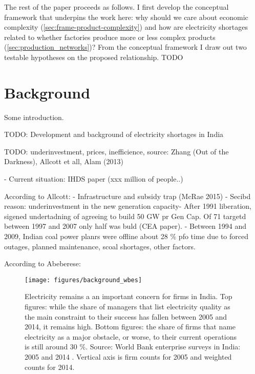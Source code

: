 \documentclass[11pt]{article}
\begin{document}
The rest of the paper proceeds as follows. I first develop the conceptual framework that underpins the work here: why should we care about economic complexity (\ref{sec:frame-product-complexity}) and how are electricity shortages related to whether factories produce more or less complex products (\ref{sec:production_networks})? From the conceptual framework I draw out two testable hypotheses on the proposed relationship. TODO

\newpage
\section{Background}%
\label{sec:background}

Some introduction.


TODO: Development and background of electricity shortages in India


TODO: underinvestment, prices, inefficience, source: Zhang (Out of the Darkness), Allcott et all, Alam (2013)

- Current situation:
IHDS paper (xxx million of people..)



According to Allcott:
- Infrastructure and subsidy trap (McRae 2015)
- Secibd reason: underinvestment in the new generation capacity- After 1991 liberation, sigened undertadning of agreeing to build 50 GW pr Gen Cap. Of 71 targetd between 1997 and 2007 only half was buld (CEA paper).
- Between 1994 and 2009, Indian coal power planrs were offline about 28 \% pfo time due to forced outages, planned maintenance, scoal shortages, other factors. 

According to Abeberese:


\begin{figure}[htpb]
	\centering
	\texttt{[image: figures/background\_wbes]}
	\caption{Electricity remains a an important concern for firms in India. Top figures: while the share of managers that list electricity quality as the main constraint to their success has fallen between 2005 and 2014, it remains high. Bottom figures: the share of firms that name electricity as a major obstacle, or worse, to their current operations is still around 30 \%. Source: World Bank enterprise surveys in India: 2005 and 2014 \citep{world_bank_enterprise_2020-2,world_bank_enterprise_2020-1}. Vertical axis is firm counts for 2005 and weighted counts for 2014.}
	\label{fig:biggest_obstacle}
\end{figure}
\end{document}
